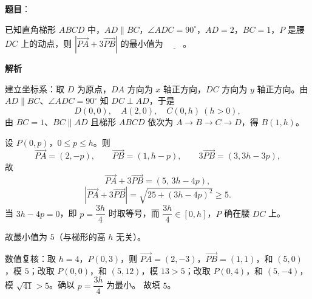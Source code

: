 \begin{answer}

\textbf{题目}：

已知直角梯形 $ABCD$ 中，$AD\parallel BC$，$\angle ADC=90^\circ$，$AD=2$，$BC=1$，$P$ 是腰 $DC$ 上的动点，则 $\left|\overrightarrow{PA}+3\overrightarrow{PB}\right|$ 的最小值为 $\underline{\qquad}$。

\textbf{解析}

建立坐标系：取 $D$ 为原点，$DA$ 方向为 $x$ 轴正方向，$DC$ 方向为 $y$ 轴正方向。由 $AD\parallel BC$、$\angle ADC=90^\circ$ 知 $DC\perp AD$，于是
\nopagebreak[4]
\[D(0,0),\quad A(2,0),\quad C(0,h)\ (h>0),\]
由 $BC=1$、$BC\parallel AD$ 且梯形 $ABCD$ 依次为 $A\to B\to C\to D$，得 $B(1,h)$。

设 $P(0,p)$，$0\leqslant p\leqslant h$。则
\nopagebreak[4]
\[\overrightarrow{PA}=(2,-p),\qquad \overrightarrow{PB}=(1,h-p),\qquad 3\overrightarrow{PB}=(3,3h-3p),\]
故
\nopagebreak[4]
\[\overrightarrow{PA}+3\overrightarrow{PB}=(5,\,3h-4p),\]
\nopagebreak[4]
\[\left|\overrightarrow{PA}+3\overrightarrow{PB}\right|=\sqrt{25+(3h-4p)^2}\geqslant5.\]
当 $3h-4p=0$，即 $p=\dfrac{3h}{4}$ 时取等号，而 $\dfrac{3h}{4}\in[0,h]$，$P$ 确在腰 $DC$ 上。

故最小值为 $5$（与梯形的高 $h$ 无关）。

数值复核：取 $h=4$，$P(0,3)$，则 $\overrightarrow{PA}=(2,-3)$，$\overrightarrow{PB}=(1,1)$，和 $(5,0)$，模 $5$；改取 $P(0,0)$，和 $(5,12)$，模 $13>5$；改取 $P(0,4)$，和 $(5,-4)$，模 $\sqrt{41}>5$。确以 $p=\dfrac{3h}{4}$ 为最小。
故填 $5$。


\end{answer}
